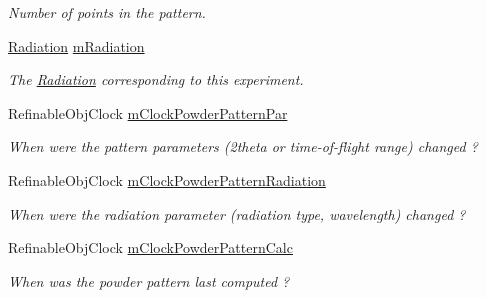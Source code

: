\begin{DoxyCompactItemize}
\begin{DoxyCompactList}\small\item\em Number of points in the pattern. \end{DoxyCompactList}\item 
\mbox{\label{class_obj_cryst_1_1_powder_pattern_a05765f5848b8f408c98061501d576da1}} 
\mbox{\hyperlink{class_obj_cryst_1_1_radiation}{Radiation}} \mbox{\hyperlink{class_obj_cryst_1_1_powder_pattern_a05765f5848b8f408c98061501d576da1}{m\+Radiation}}
\begin{DoxyCompactList}\small\item\em The \mbox{\hyperlink{class_obj_cryst_1_1_radiation}{Radiation}} corresponding to this experiment. \end{DoxyCompactList}\item 
\mbox{\label{class_obj_cryst_1_1_powder_pattern_ae346e0d2354a37cbaad34c2d053f52be}} 
Refinable\+Obj\+Clock \mbox{\hyperlink{class_obj_cryst_1_1_powder_pattern_ae346e0d2354a37cbaad34c2d053f52be}{m\+Clock\+Powder\+Pattern\+Par}}
\begin{DoxyCompactList}\small\item\em When were the pattern parameters (2theta or time-\/of-\/flight range) changed ? \end{DoxyCompactList}\item 
\mbox{\label{class_obj_cryst_1_1_powder_pattern_afb844ef286aa8109960c1de1fa7f1972}} 
Refinable\+Obj\+Clock \mbox{\hyperlink{class_obj_cryst_1_1_powder_pattern_afb844ef286aa8109960c1de1fa7f1972}{m\+Clock\+Powder\+Pattern\+Radiation}}
\begin{DoxyCompactList}\small\item\em When were the radiation parameter (radiation type, wavelength) changed ? \end{DoxyCompactList}\item 
\mbox{\label{class_obj_cryst_1_1_powder_pattern_aafa1a93644c2c7b5e30dcf6c2d0c7b94}} 
Refinable\+Obj\+Clock \mbox{\hyperlink{class_obj_cryst_1_1_powder_pattern_aafa1a93644c2c7b5e30dcf6c2d0c7b94}{m\+Clock\+Powder\+Pattern\+Calc}}
\begin{DoxyCompactList}\small\item\em When was the powder pattern last computed ? \end{DoxyCompactList}\item 

\end{DoxyCompactItemize}
